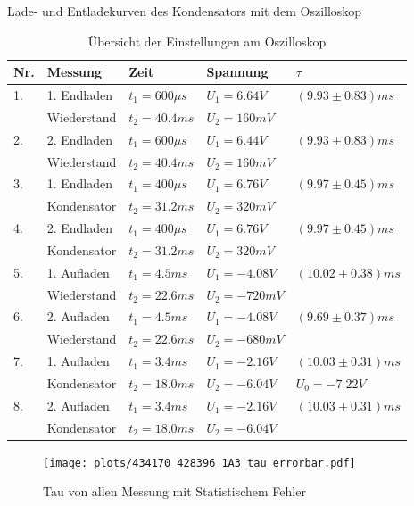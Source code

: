 \documentclass[twoside]{protokoll}
\begin{document}
\begin{aufgabe}{Lade- und Entladekurven des Kondensators mit dem Oszilloskop}
 
\begin{table}[H]
        \centering
        \begin{tabularx}{1.00\textwidth}{l X X X X}
            \toprule
            \textbf{Nr.} & \textbf{Messung} & \textbf{Zeit} & \textbf{Spannung} & $\tau$ \\
            \midrule
            1. & 1. Endladen & $t_1 = 600 \mu s$ & $U_1 = 6.64V$ & $(9.93 \pm 0.83)ms$\\
            & Wiederstand & $t_2 = 40.4 ms $  & $U_2 = 160mV$ & \\
            \midrule
            2. & 2. Endladen     & $t_1 = 600 \mu s$ & $U_1 = 6.44V$ & $(9.93 \pm 0.83)ms$ \\
            & Wiederstand  & $t_2 = 40.4 ms $  & $U_2 = 160mV$ \\
            \bottomrule
            3. & 1. Endladen     & $t_1 = 400 \mu s$ & $U_1 = 6.76V$ & $(9.97 \pm 0.45)ms$ \\
            & Kondensator  & $t_2 = 31.2 ms $  & $U_2 = 320mV$ \\
            \midrule
            4. & 2. Endladen     & $t_1 = 400 \mu s$ & $U_1 = 6.76V$ & $(9.97 \pm 0.45)ms$ \\
            & Kondensator  & $t_2 = 31.2 ms $  & $U_2 = 320mV$ \\
            \bottomrule
            5. & 1. Aufladen     & $t_1 = 4.5 ms  $ & $U_1 = -4.08V$ & $(10.02 \pm 0.38)ms$ \\
            & Wiederstand  & $t_2 = 22.6 ms $  & $U_2 = -720mV$ \\
            \midrule
            6. & 2. Aufladen     & $t_1 = 4.5 ms  $ & $U_1 = -4.08V$ & $(9.69 \pm 0.37)ms$ \\
            & Wiederstand  & $t_2 = 22.6 ms $  & $U_2 = -680mV$ \\
            \bottomrule
            7. & 1. Aufladen     & $t_1 = 3.4 ms  $ & $U_1 = -2.16V$ & $(10.03 \pm 0.31)ms$ \\
            & Kondensator  & $t_2 = 18.0 ms $  & $U_2 = -6.04V$ & $ U_0 = -7.22V$ \\
            \midrule
            8. & 2. Aufladen     & $t_1 = 3.4 ms  $ & $U_1 = -2.16V$ & $(10.03 \pm 0.31)ms$ \\
            & Kondensator  & $t_2 = 18.0 ms $  & $U_2 = -6.04V$ \\
            \bottomrule
        \end{tabularx}
        \caption{Übersicht der Einstellungen am Oszilloskop}
        \label{tab:mytable}
    \end{table}
    
\begin{figure}[H]
  \centering
    \texttt{[image: plots/434170\_428396\_1A3\_tau\_errorbar.pdf]}
    \caption{Tau von allen Messung mit Statistischem Fehler}
  \centering
\end{figure}
 
\end{aufgabe}
\end{document}
